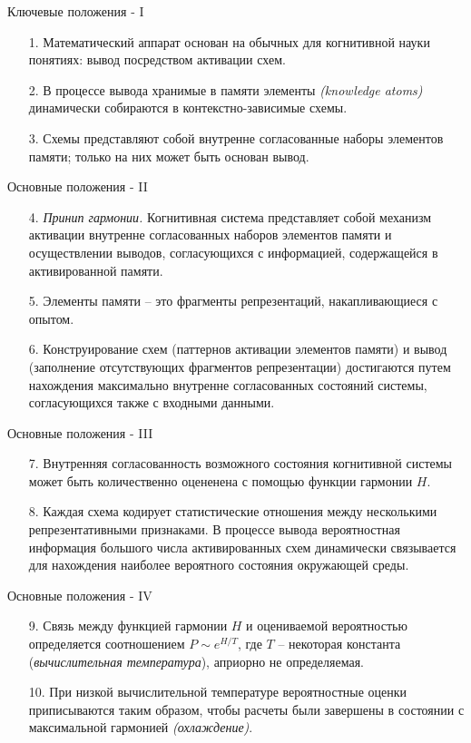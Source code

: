 \documentclass{beamer}
\begin{document}
\begin{frame}{Ключевые положения - I}
\begin{itemize}
	\item[1.] Математический аппарат основан на обычных для когнитивной науки понятиях: вывод посредством активации схем.
	\medskip
	\item[2.] В процессе вывода хранимые в памяти элементы \textit{(knowledge atoms)} динамически собираются в контекстно-зависимые схемы.
	\medskip
	\item[3.] Схемы представляют собой внутренне согласованные наборы элементов памяти; только на них может быть основан вывод.
\end{itemize}
\end{frame}

\begin{frame}{Основные положения - II}
\begin{itemize}
	\item[4.] \textit{Принип гармонии.} Когнитивная система представляет собой механизм активации внутренне согласованных наборов элементов памяти и осуществлении выводов, согласующихся с информацией, содержащейся в активированной памяти.
	\medskip
	\item[5.] Элементы памяти -- это фрагменты репрезентаций, накапливающиеся с опытом.
	\medskip
	\item[6.] Конструирование схем (паттернов активации элементов памяти) и вывод (заполнение отсутствующих фрагментов репрезентации) достигаются путем нахождения максимально внутренне согласованных состояний системы, согласующихся также с входными данными.
\end{itemize}
\end{frame}

\begin{frame}{Основные положения - III}
\begin{itemize}
	\item[7.] Внутренняя согласованность возможного состояния когнитивной системы может быть количественно оцененена с помощью функции гармонии $H$.
	\medskip
	\item[8.] Каждая схема кодирует статистические отношения между несколькими репрезентативными признаками. В процессе вывода вероятностная информация большого числа активированных схем динамически связывается для нахождения наиболее вероятного состояния окружающей среды.
\end{itemize}
\end{frame}

\begin{frame}{Основные положения - IV}
\begin{itemize}
	\item[9.] Связь между функцией гармонии $H$ и оцениваемой вероятностью определяется соотношением $P \sim e^{H/T}$, где $T$ -- некоторая константа (\textit{вычислительная температура}), априорно не определяемая.
	\medskip	
	\item[10.] При низкой вычислительной температуре вероятностные оценки приписываются таким образом, чтобы расчеты были завершены в состоянии с максимальной гармонией \textit{(охлаждение)}.
\end{itemize}
\end{frame}
\end{document}
